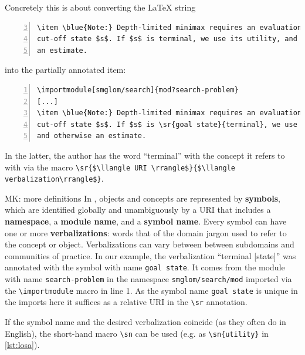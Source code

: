 \documentclass{llncs}
\def\llangle{\langle\kern-.2em\langle}
\def\rrangle{\rangle\kern-.2em\rangle}
\begin{document}
Concretely this is about converting the {\LaTeX} string
\begin{lstlisting}[numbers=left,firstnumber=3,
caption=The unannotated {\LaTeX} sources of \cref{fig:lo},label=lst:los]
\item \blue{Note:} Depth-limited minimax requires an evaluation for every
cut-off state $s$. If $s$ is terminal, we use its utility, and otherwise
an estimate.
\end{lstlisting}
into the partially annotated item:
\begin{lstlisting}[morekeywords={sr,importmodule},numbers=left,
caption=Annotating ``terminal'' and ``utility'' in \cref{lst:los},label=lst:losa]
\importmodule[smglom/search]{mod?search-problem}
[...]
\item \blue{Note:} Depth-limited minimax requires an evaluation for every
cut-off state $s$. If $s$ is \sr{goal state}{terminal}, we use its \sn{utility},
and otherwise an estimate.
\end{lstlisting}
In the latter, the author has the word ``terminal'' with the concept it refers to with 
via the \sTeX macro
\lstinline[mathescape]|\sr{$\llangle URI \rrangle$}{$\llangle verbalization\rrangle$}|.

\begin{newpart}{MK: more definitions}
  In \sTeX, objects and concepts are represented by \textbf{symbols}, which are identified
globally and unambiguously by a URI that includes a \textbf{namespace}, a \textbf{module
  name}, and a \textbf{symbol name}. Every symbol can have one or more
\textbf{verbalizations}: words that of the domain jargon used to refer to the concept or
object. Verbalizations can vary between between subdomains and communities of practice. In
our example, the verbalization ``terminal [state]'' was annotated with the symbol with
name \lstinline|goal state|. It comes from the module with name \lstinline|search-problem|
in the namespace \lstinline|smglom/search/mod| imported via the \lstinline|\importmodule|
macro in line 1. As the symbol name \lstinline|goal state| is unique in the imports here
it suffices as a relative URI in the \lstinline|\sr| annotation.

If the symbol name and the desired verbalization coincide (as they often do in English),
the short-hand macro \lstinline|\sn| can be used (e.g. as \lstinline|\sn{utility}| in
\cref{lst:losa}).
\end{newpart}
\end{document}

